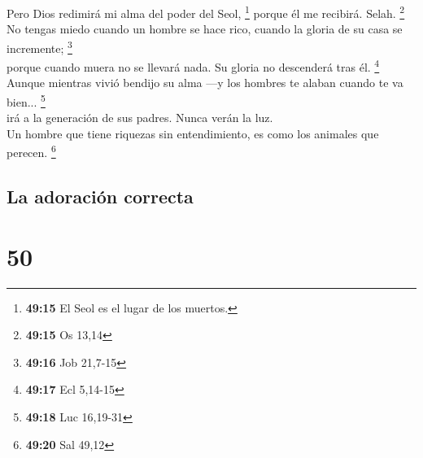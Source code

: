  Pero Dios redimirá mi alma del poder del Seol,
\footnote{\textbf{49:15} El Seol es el lugar de los muertos.} porque él
me recibirá. Selah. \footnote{\textbf{49:15} Os 13,14}\\
 No tengas miedo cuando un hombre se hace rico, cuando la
gloria de su casa se incremente; \footnote{\textbf{49:16} Job 21,7-15}\\
 porque cuando muera no se llevará nada. Su gloria no
descenderá tras él. \footnote{\textbf{49:17} Ecl 5,14-15}\\
 Aunque mientras vivió bendijo su alma ---y los hombres
te alaban cuando te va bien... \footnote{\textbf{49:18} Luc 16,19-31}\\
 irá a la generación de sus padres. Nunca verán la luz.\\
 Un hombre que tiene riquezas sin entendimiento, es como
los animales que perecen. \footnote{\textbf{49:20} Sal 49,12}

\hypertarget{la-adoraciuxf3n-correcta}{%
\subsection{La adoración correcta}\label{la-adoraciuxf3n-correcta}}

\hypertarget{section-48}{%
\section{50}\label{section-48}}

